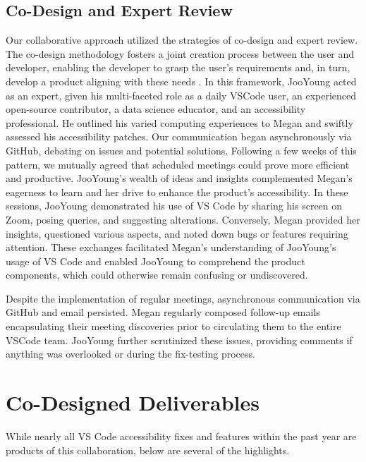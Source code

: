 \documentclass[sigconf]{acmart}
\begin{document}
\hypertarget{co-design-and-expert-review}{%
\subsection{Co-Design and Expert
Review}\label{co-design-and-expert-review}}

Our collaborative approach utilized the strategies of co-design and
expert review. The co-design methodology fosters a joint creation
process between the user and developer, enabling the developer to grasp
the user's requirements and, in turn, develop a product aligning with
these needs \citep{sandersCocreationNewLandscapes2008}. In this
framework, JooYoung acted as an expert, given his multi-faceted role as
a daily VSCode user, an experienced open-source contributor, a data
science educator, and an accessibility professional. He outlined his
varied computing experiences to Megan and swiftly assessed his
accessibility patches. Our communication began asynchronously via
GitHub, debating on issues and potential solutions. Following a few
weeks of this pattern, we mutually agreed that scheduled meetings could
prove more efficient and productive. JooYoung's wealth of ideas and
insights complemented Megan's eagerness to learn and her drive to
enhance the product's accessibility. In these sessions, JooYoung
demonstrated his use of VS Code by sharing his screen on Zoom, posing
queries, and suggesting alterations. Conversely, Megan provided her
insights, questioned various aspects, and noted down bugs or features
requiring attention. These exchanges facilitated Megan's understanding
of JooYoung's usage of VS Code and enabled JooYoung to comprehend the
product components, which could otherwise remain confusing or
undiscovered.

Despite the implementation of regular meetings, asynchronous
communication via GitHub and email persisted. Megan regularly composed
follow-up emails encapsulating their meeting discoveries prior to
circulating them to the entire VSCode team. JooYoung further scrutinized
these issues, providing comments if anything was overlooked or during
the fix-testing process.

\hypertarget{co-designed-deliverables}{%
\section{Co-Designed Deliverables}\label{co-designed-deliverables}}

While nearly all VS Code accessibility fixes and features within the
past year are products of this collaboration, below are several of the
highlights.
\end{document}
